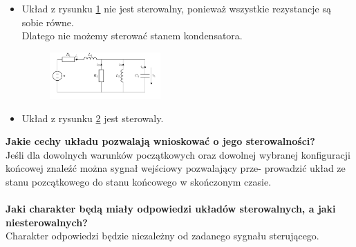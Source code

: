 \documentclass[12pt, letterpaper]{article}
\begin{document}
\begin{enumerate}
\begin{itemize}
\begin{figure}[H]
                    \caption{}
                    \label{fig:3}
                \end{figure}
                \item Układ z rysunku \ref{fig:3} nie jest sterowalny, ponieważ wszystkie rezystancje są sobie równe.\\
                Dlatego nie możemy sterować stanem kondensatora.
                \begin{figure}[H]
                    \centering
                    \includegraphics[width=0.4\textwidth]{lab3/rys4}
                    \caption{}
                    \label{fig:4}
                \end{figure}
                \item Układ z rysunku \ref{fig:4} jest sterowaly.
            \end{itemize}
            \textbf{\newline Jakie cechy układu pozwalają wnioskować o jego sterowalności?}\\
            Jeśli dla dowolnych warunków początkowych oraz dowolnej
            wybranej konfiguracji końcowej znaleźć można sygnał wejściowy pozwalający prze-
            prowadzić układ ze stanu pozcątkowego do stanu końcowego w skończonym czasie.\\\\
            \textbf{Jaki charakter będą miały odpowiedzi układów sterowalnych, a jaki niesterowalnych?}\\
            Charakter odpowiedzi będzie niezależny od zadanego sygnału sterującego.


\end{enumerate}
\end{document}
